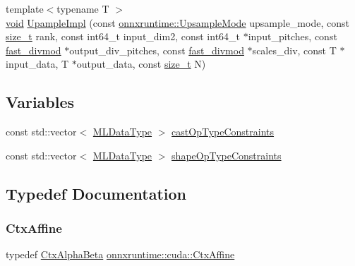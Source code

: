 \begin{DoxyCompactItemize}
\item 
{\footnotesize template$<$typename T $>$ }\\\mbox{\hyperlink{mlasi_8h_a88f941d423cb2a819b70a1358982b1a6}{void}} \mbox{\hyperlink{namespaceonnxruntime_1_1cuda_a678bd36af10db05e306d877d311e0747}{Upample\+Impl}} (const \mbox{\hyperlink{namespaceonnxruntime_ac1731b73e10b6a91015c32c7e29d03bd}{onnxruntime\+::\+Upsample\+Mode}} upsample\+\_\+mode, const \mbox{\hyperlink{mlasi_8h_a503efbc1c6e50825320ad909366b78ab}{size\+\_\+t}} rank, const int64\+\_\+t input\+\_\+dim2, const int64\+\_\+t $\ast$input\+\_\+pitches, const \mbox{\hyperlink{classonnxruntime_1_1cuda_1_1fast__divmod}{fast\+\_\+divmod}} $\ast$output\+\_\+div\+\_\+pitches, const \mbox{\hyperlink{classonnxruntime_1_1cuda_1_1fast__divmod}{fast\+\_\+divmod}} $\ast$scales\+\_\+div, const T $\ast$input\+\_\+data, T $\ast$output\+\_\+data, const \mbox{\hyperlink{mlasi_8h_a503efbc1c6e50825320ad909366b78ab}{size\+\_\+t}} N)
\end{DoxyCompactItemize}
\subsection*{Variables}
\begin{DoxyCompactItemize}
\item 
const std\+::vector$<$ \mbox{\hyperlink{namespaceonnxruntime_ad77d0a6e838ec7da5dc35fed5ee66b49}{M\+L\+Data\+Type}} $>$ \mbox{\hyperlink{namespaceonnxruntime_1_1cuda_a272ed1bb036b029ae628321d1ff6bd0a}{cast\+Op\+Type\+Constraints}}
\item 
const std\+::vector$<$ \mbox{\hyperlink{namespaceonnxruntime_ad77d0a6e838ec7da5dc35fed5ee66b49}{M\+L\+Data\+Type}} $>$ \mbox{\hyperlink{namespaceonnxruntime_1_1cuda_aa2fb1530bbf277f6572e0c2865818fad}{shape\+Op\+Type\+Constraints}}
\end{DoxyCompactItemize}


\subsection{Typedef Documentation}
\mbox{\label{namespaceonnxruntime_1_1cuda_acc48ed8e0689632975871e22ba2ccecb}} 
\subsubsection{\texorpdfstring{Ctx\+Affine}{CtxAffine}}
{\footnotesize\ttfamily typedef \mbox{\hyperlink{structonnxruntime_1_1cuda_1_1CtxAlphaBeta}{Ctx\+Alpha\+Beta}} \mbox{\hyperlink{namespaceonnxruntime_1_1cuda_acc48ed8e0689632975871e22ba2ccecb}{onnxruntime\+::cuda\+::\+Ctx\+Affine}}}

